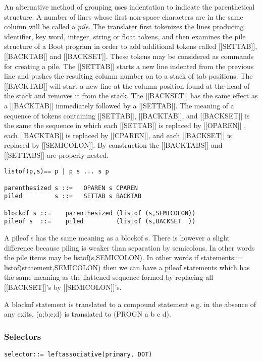 \documentclass{article}
\begin{document}
An alternative method of grouping uses indentation to indicate the
parenthetical structure.
A number of lines whose first non-space characters are in the same
column will be called a \emph{pile}.  The translater first tokenizes the
lines producing identifier, key word, integer, string or float tokens,
and then examines the pile structure of a Boot program
in order to add additional tokens called [[SETTAB]], [[BACKTAB]]
and [[BACKSET]].
These tokens may be considered as commands for creating a pile.
The [[SETTAB]] starts a new line indented from the previous line and
pushes the resulting column number on to a stack of tab positions.
The [[BACKTAB]] will start a new line at the column position found
at the head of the stack and removes it from the stack.
The [[BACKSET]] has the same effect as a [[BACKTAB]] immediately followed
by a [[SETTAB]].
The meaning of a sequence of tokens containing [[SETTAB]],
[[BACKTAB]], and [[BACKSET]] is the same the sequence in which each
[[SETTAB]] is replaced by [[OPAREN]] , each [[BACKTAB]] is replaced by
[[CPAREN]], and each [[BACKSET]] is replaced by [[SEMICOLON]]. By
construction the [[BACKTABS]] and [[SETTABS]] are properly nested.
\begin{verbatim}
listof(p,s)== p | p s ... s p

parenthesized s ::=   OPAREN s CPAREN
piled         s ::=   SETTAB s BACKTAB

blockof s ::=    parenthesized (listof (s,SEMICOLON))
pileof s  ::=    piled         (listof (s,BACKSET  ))
\end{verbatim}

A pileof s has the same meaning as a blockof s.
There is however a slight difference because piling is weaker than
separation by semicolons. In other words the pile items
may be listof(s,SEMICOLON).
In other words if statements::= listof(statement,SEMICOLON) then
we can have a pileof statements which has the same meaning as
the flattened sequence formed by replacing
all [[BACKSET]]'s by [[SEMICOLON]]'s.

A blockof statement is translated to a compound statement
e.g. in the absence of any exits,
(a;b;c;d) is translated to (PROGN a b c d).

\subsubsection{Selectors}
\label{sec:boot:selector}

\begin{verbatim}
selector::= leftassociative(primary, DOT)
\end{verbatim}
\end{document}

